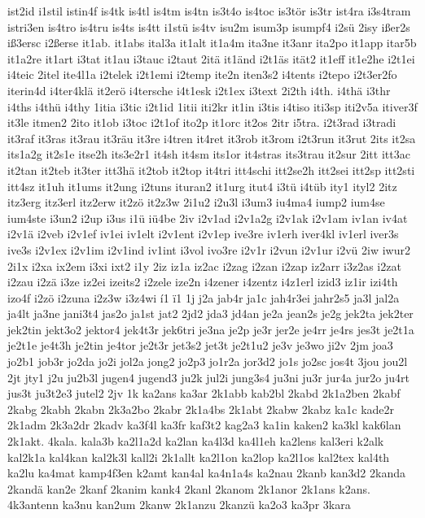 {ist2id
i1stil
istin4f
is4tk
is4tl
is4tm
is4tn
is3t4o
is4toc
is3tör
is3tr
ist4ra
i3s4tram
istri3en
is4tro
is4tru
is4ts
is4tt
i1stü
is4tv
isu2m
isum3p
isumpf4
i2sü
2isy
ißer2s
iß3ersc
i2ßerse
it1ab.
it1abs
ital3a
it1alt
it1a4m
ita3ne
it3anr
ita2po
it1app
itar5b
it1a2re
it1art
i3tat
it1au
i3tauc
i2taut
2itä
it1änd
i2t1äs
ität2
it1eff
it1e2he
i2t1ei
i4teic
2itel
ite4l1a
i2telek
i2t1emi
i2temp
ite2n
iten3s2
i4tents
i2tepo
i2t3er2fo
iterin4d
i4ter4klä
it2erö
i4tersche
i4t1esk
i2t1ex
i3text
2i2th
i4th.
i4thä
i3thr
i4ths
i4thü
i4thy
1itia
i3tic
i2t1id
1itii
iti2kr
it1in
i3tis
i4tiso
iti3sp
iti2v5a
itiver3f
it3le
itmen2
2ito
it1ob
i3toc
i2t1of
ito2p
it1orc
it2os
2itr
i5tra.
i2t3rad
i3tradi
it3raf
it3ras
it3rau
it3räu
it3re
i4tren
it4ret
it3rob
it3rom
i2t3run
it3rut
2its
it2sa
its1a2g
it2s1e
itse2h
its3e2r1
it4sh
it4sm
its1or
it4stras
its3trau
it2sur
2itt
itt3ac
it2tan
it2teb
it3ter
itt3hä
it2tob
it2top
it4tri
itt4schi
itt2se2h
itt2sei
itt2sp
itt2sti
itt4sz
it1uh
it1ums
it2ung
i2tuns
ituran2
it1urg
itut4
i3tü
i4tüb
ity1
ityl2
2itz
itz3erg
itz3erl
itz2erw
it2zö
it2z3w
2i1u2
i2u3l
i3um3
iu4ma4
iump2
ium4se
ium4ste
i3un2
i2up
i3us
i1ü
iü4be
2iv
i2v1ad
i2v1a2g
i2v1ak
i2v1am
iv1an
iv4at
i2v1ä
i2veb
i2v1ef
iv1ei
iv1elt
i2v1ent
i2v1ep
ive3re
iv1erh
iver4kl
iv1erl
iver3s
ive3s
i2v1ex
i2v1im
i2v1ind
iv1int
i3vol
ivo3re
i2v1r
i2vun
i2v1ur
i2vü
2iw
iwur2
2i1x
i2xa
ix2em
i3xi
ixt2
i1y
2iz
iz1a
iz2ac
i2zag
i2zan
i2zap
iz2arr
i3z2as
i2zat
i2zau
i2zä
i3ze
iz2ei
izeits2
i2zele
ize2n
i4zener
i4zentz
i4z1erl
izid3
iz1ir
izi4th
izo4f
i2zö
i2zuna
i2z3w
i3z4wi
í1
ï1
1j
j2a
jab4r
ja1c
jah4r3ei
jahr2s5
ja3l
jal2a
ja4lt
ja3ne
jani3t4
jas2o
ja1st
jat2
2jd2
jda3
jd4an
je2a
jean2s
je2g
jek2ta
jek2ter
jek2tin
jekt3o2
jektor4
jek4t3r
jek6tri
je3na
je2p
je3r
jer2e
je4rr
je4rs
jes3t
je2t1a
je2t1e
je4t3h
je2tin
je4tor
je2t3r
jet3s2
jet3t
je2t1u2
je3v
je3wo
ji2v
2jm
joa3
jo2b1
job3r
jo2da
jo2i
jol2a
jong2
jo2p3
jo1r2a
jor3d2
jo1s
jo2sc
jos4t
3jou
jou2l
2jt
jty1
j2u
ju2b3l
jugen4
jugend3
ju2k
jul2i
jung3s4
ju3ni
ju3r
jur4a
jur2o
ju4rt
jus3t
ju3t2e3
jutel2
2jv
1k
ka2ans
ka3ar
2k1abb
kab2bl
2kabd
2k1a2ben
2kabf
2kabg
2kabh
2kabn
2k3a2bo
2kabr
2k1a4bs
2k1abt
2kabw
2kabz
ka1c
kade2r
2k1adm
2k3a2dr
2kadv
ka3f4l
ka3fr
kaf3t2
kag2a3
ka1in
kaken2
ka3kl
kak6lan
2k1akt.
4kala.
kala3b
ka2l1a2d
ka2lan
ka4l3d
ka4l1eh
ka2lens
kal3eri
k2alk
kal2k1a
kal4kan
kal2k3l
kall2i
2k1allt
ka2l1on
ka2lop
ka2l1os
kal2tex
kal4th
ka2lu
ka4mat
kamp4f3en
k2amt
kan4al
ka4n1a4s
ka2nau
2kanb
kan3d2
2kanda
2kandä
kan2e
2kanf
2kanim
kank4
2kanl
2kanom
2k1anor
2k1ans
k2ans.
4k3antenn
ka3nu
kan2um
2kanw
2k1anzu
2kanzü
ka2o3
ka3pr
3kara
}
